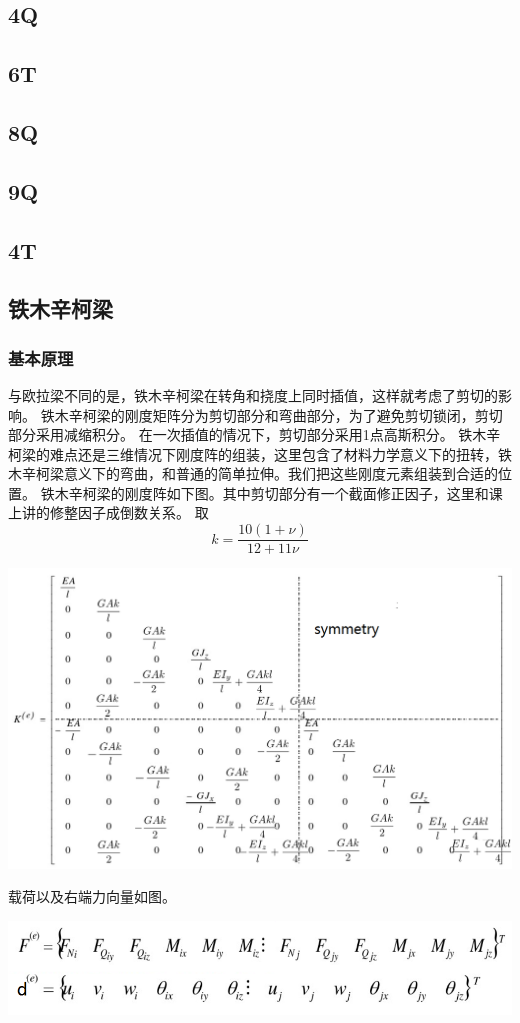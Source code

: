 \documentclass[UTF8]{ctexbook}
\begin{document}
\subsection{4Q}

\subsection{6T}

\subsection{8Q}

\subsection{9Q}

\subsection{4T}

\subsection{铁木辛柯梁}
\subsubsection{基本原理}
与欧拉梁不同的是，铁木辛柯梁在转角和挠度上同时插值，这样就考虑了剪切的影响。
铁木辛柯梁的刚度矩阵分为剪切部分和弯曲部分，为了避免剪切锁闭，剪切部分采用减缩积分。
在一次插值的情况下，剪切部分采用1点高斯积分。
铁木辛柯梁的难点还是三维情况下刚度阵的组装，这里包含了材料力学意义下的扭转，铁木辛柯梁意义下的弯曲，和普通的简单拉伸。我们把这些刚度元素组装到合适的位置。
铁木辛柯梁的刚度阵如下图。其中剪切部分有一个截面修正因子，这里和课上讲的修整因子成倒数关系。
取
$$k=\frac{10(1+\nu)}{12+11\nu}$$
\begin{center}
\includegraphics[width=1.0\textwidth]{timoshenko1.png}
\end{center}
载荷以及右端力向量如图。
\begin{center}
\includegraphics[width=1.0\textwidth]{beam2.png}
\end{center}
\end{document}
